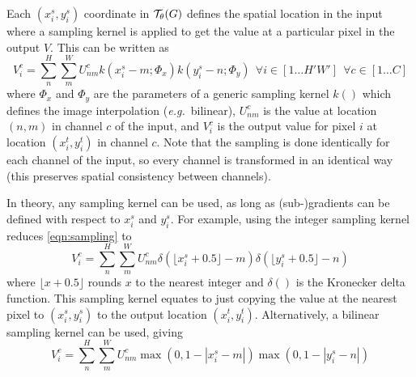 \documentclass{article} %
\def\eg{\emph{e.g.}}
\begin{document}
Each $(x^s_i,y^s_i)$ coordinate in ${\cal T}_\theta (G)$ defines the spatial
location in the input where a sampling kernel is applied to get the
value at a particular pixel in the output $V$. This can be written as
\begin{equation}
V_i^c = \sum_{n}^{H} \sum_{m}^W U^c_{nm}k(x_i^s - m;
\Phi_x)k(y_i^s-n;\Phi_y)~~\forall i\in[1\ldots H'W']~ ~\forall c\in[1\ldots C]
\label{eqn:sampling}
\end{equation}
where $\Phi_x$ and $\Phi_y$ are the parameters of a generic sampling kernel
$k()$ which defines the image interpolation (\eg~bilinear), $U^c_{nm}$ is the
value at location $(n,m)$ in channel $c$ of the input, and $V_i^c$ is
the output value for pixel $i$ at location $(x_i^t, y_i^t)$ in channel $c$. Note
that the sampling is done identically for each channel of the input, so every
channel is transformed in an identical way (this preserves spatial consistency
between channels).

In theory, any sampling kernel can be used, as long as (sub-)gradients can be defined
with respect to $x_i^s$ and $y_i^s$. For example, using the integer sampling
kernel reduces \eqref{eqn:sampling} to
\begin{equation}
V_i^c = \sum_{n}^{H} \sum_{m}^W U^c_{nm}\delta(\lfloor x_i^s + 0.5 \rfloor -
m)\delta(\lfloor y_i^s + 0.5 \rfloor - n)
\label{eqn:integer}
\end{equation}
where $\lfloor  x + 0.5 \rfloor$ rounds $x$ to the nearest integer and
$\delta()$ is the Kronecker delta function. This sampling kernel equates to just
copying the value at the nearest pixel to $(x_i^s,y_i^s)$ to the output location
$(x_i^t,y_i^t)$. Alternatively, a bilinear sampling kernel can be used, giving
\begin{equation}
V_i^c = \sum_{n}^{H} \sum_{m}^W U^c_{nm}\max(0, 1-|x_i^s-m|)\max(0,1-|y_i^s-n|)
\label{eqn:bilinear}
\end{equation}
\end{document}
